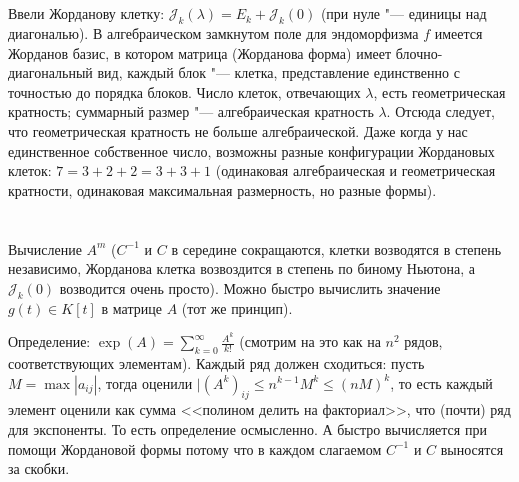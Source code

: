 \section{} %
Ввели Жорданову клетку: $\mathcal{J}_k(\lambda)=E_k+\mathcal{J}_k(0)$ (при нуле "--- единицы над диагональю).
В алгебраическом замкнутом поле для эндоморфизма $f$ имеется Жорданов базис, в котором матрица (Жорданова форма) имеет блочно-диагональный вид,
каждый блок "--- клетка, представление единственно с точностью до порядка блоков.
Число клеток, отвечающих $\lambda$, есть геометрическая кратность; суммарный размер "--- алгебраическая кратность $\lambda$.
Отсюда следует, что геометрическая кратность не больше алгебраической.
Даже когда у нас единственное собственное число, возможны разные конфигурации Жордановых клеток: $7=3+2+2=3+3+1$ (одинаковая алгебраическая и геометрическая кратности, одинаковая максимальная размерность, но разные формы).

\section{} %
\TODO[доказательство, 2.20]

\section{} %
\TODO[доказательство, 2.20]

\section{} %
Вычисление $A^m$ ($C^{-1}$ и $C$ в середине сокращаются, клетки возводятся в степень независимо, Жорданова клетка возвоздится в степень по биному Ньютона, а $\mathcal{J}_k(0)$ возводится очень просто).
Можно быстро вычислить значение $g(t) \in K[t]$ в матрице $A$ (тот же принцип).

Определение:
$\exp(A) = \sum_{k=0}^\infty \frac{A^k}{k!}$ (смотрим на это как на $n^2$ рядов, соответствующих элементам).
Каждый ряд должен сходиться: пусть $M=\max |a_{ij}|$, тогда оценили $|(A^k)_{ij} \le n^{k-1}M^k \le (nM) ^ k$, то есть каждый элемент оценили как сумма <<полином делить на факториал>>, что (почти) ряд для экспоненты.
То есть определение осмысленно.
А быстро вычисляется при помощи Жордановой формы потому что в каждом слагаемом $C^{-1}$ и $C$ выносятся за скобки.

